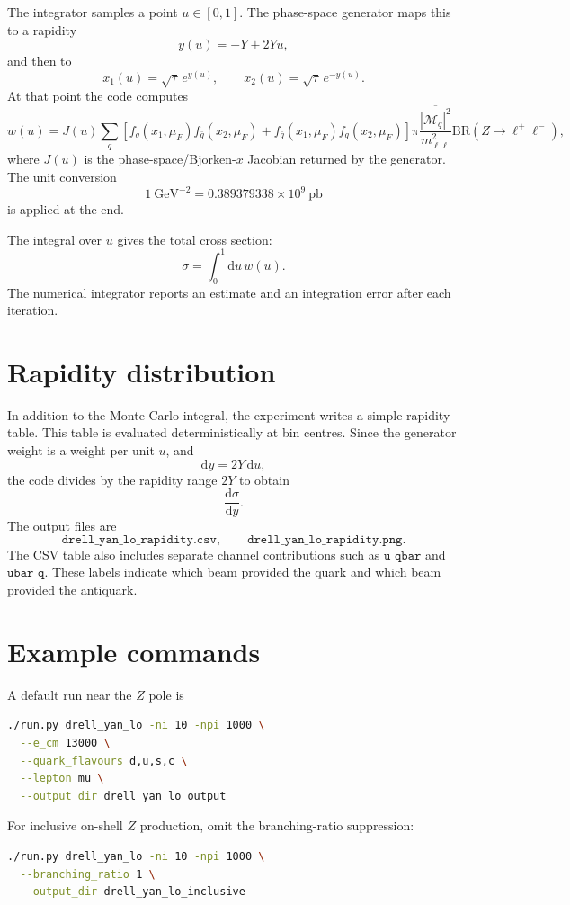 \documentclass[11pt]{article}
\newcommand{\dd}{\mathrm{d}}
\newcommand{\mll}{m_{\ell\ell}}
\newcommand{\pb}{\mathrm{pb}}
\begin{document}
The integrator samples a point \(u\in[0,1]\).  The phase-space generator maps
this to a rapidity
\[
  y(u)= -Y + 2Yu,
\]
and then to
\[
  x_1(u)=\sqrt{\tau}\,e^{y(u)}, \qquad
  x_2(u)=\sqrt{\tau}\,e^{-y(u)}.
\]
At that point the code computes
\[
  w(u)
  =
  J(u)
  \sum_q
  \left[
    f_q(x_1,\mu_F)f_{\bar q}(x_2,\mu_F)
    +
    f_{\bar q}(x_1,\mu_F)f_q(x_2,\mu_F)
    \right]
  \pi
  \frac{\overline{|\mathcal{M}_q|^2}}{\mll^2}
  \mathrm{BR}(Z\to\ell^+\ell^-),
\]
where \(J(u)\) is the phase-space/Bjorken-\(x\) Jacobian returned by the
generator.  The unit conversion
\[
  1~\mathrm{GeV}^{-2} = 0.389379338\times 10^9~\pb
\]
is applied at the end.

The integral over \(u\) gives the total cross section:
\[
  \sigma = \int_0^1 \dd u\, w(u).
\]
The numerical integrator reports an estimate and an integration error after
each iteration.

\section{Rapidity distribution}

In addition to the Monte Carlo integral, the experiment writes a simple
rapidity table.  This table is evaluated deterministically at bin centres.
Since the generator weight is a weight per unit \(u\), and
\[
  \dd y = 2Y\,\dd u,
\]
the code divides by the rapidity range \(2Y\) to obtain
\[
  \frac{\dd\sigma}{\dd y}.
\]
The output files are
\[
  \texttt{drell\_yan\_lo\_rapidity.csv},
  \qquad
  \texttt{drell\_yan\_lo\_rapidity.png}.
\]
The CSV table also includes separate channel contributions such as
\(\texttt{u qbar}\) and \(\texttt{ubar q}\).  These labels indicate which beam
provided the quark and which beam provided the antiquark.

\section{Example commands}

A default run near the \(Z\) pole is
\begin{lstlisting}[language=bash]
./run.py drell_yan_lo -ni 10 -npi 1000 \
  --e_cm 13000 \
  --quark_flavours d,u,s,c \
  --lepton mu \
  --output_dir drell_yan_lo_output
\end{lstlisting}
For inclusive on-shell \(Z\) production, omit the branching-ratio suppression:
\begin{lstlisting}[language=bash]
./run.py drell_yan_lo -ni 10 -npi 1000 \
  --branching_ratio 1 \
  --output_dir drell_yan_lo_inclusive
\end{lstlisting}
\end{document}
